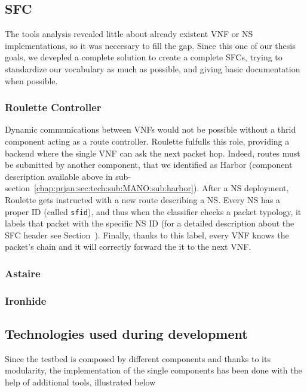 \subsection{SFC}
The tools analysis revealed little about already existent VNF or NS
implementations, so it was neccesary to fill the gap. Since this one of our
thesis goals, we devepled a complete solution to create a complete SFCs, trying
to standardize our vocabulary as much as possible, and giving basic
documentation when possible.

\subsubsection{Roulette Controller}
\label{chap:prjan:sec:tech:sub:SFC:sub:roulette}
Dynamic communications between VNFs would not be possible without a thrid
component acting as a route controller. Roulette fulfulls this role, providing a
backend where the single VNF can ask the next packet hop. Indeed, routes must be
submitted by another component, that we identified as Harbor (component
description available above in
sub-section~\ref{chap:prjan:sec:tech:sub:MANO:sub:harbor}). After a NS
deployment, Roulette gets instructed with a new route describing a NS. Every NS
has a proper ID (called \verb!sfid!), and thus when the classifier checks a
packet typology, it labels that packet with the specific NS ID (for a detailed
description about the SFC header see Section~). Finally, thanks to this label, every VNF knows the packet's chain and
it will correctly forward the it to the next VNF.

\subsubsection{Astaire}

\subsubsection{Ironhide}


\subsection{Technologies used during development}

Since the testbed is composed by different components and thanks to its 
modularity, the implementation of the single components has been done with the 
help of additional tools, illustrated below

